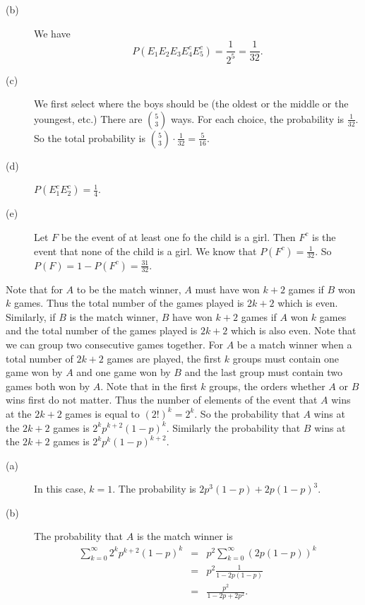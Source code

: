 \begin{description}
\begin{description}
\item[(b)] We have 
$$P(E_{1}E_{2}E_{3}E^{c}_{4}E^{c}_{5})=\frac{1}{2^{5}}=\frac{1}{32}.$$

\item[(c)] We first select where the boys should be (the oldest or the middle 
or the youngest, etc.) There are ${5\choose 3}$ ways. For each choice,
the probability is $\frac{1}{32}$. So the total probability 
is ${5\choose 3}\cdot \frac{1}{32}=\frac{5}{16}$. 

\item[(d)] $P(E_{1}^{c}E_{2}^{c})=\frac{1}{4}$.

\item[(e)] Let $F$ be the event of at least one fo the child is a girl.
Then $F^{c}$ is the event that none of the child is a girl. 
We know that $P(F^{c})=\frac{1}{32}$. So $P(F)=1-P(F^{c})=\frac{31}{32}$.

\end{description}

\item[{\rm 73.}] Note that for $A$ to be the match winner, $A$ must 
have won $k+2$ games if $B$ won $k$ games. Thus the total number of 
the games  played is $2k+2$ which is even. Similarly, if $B$ is the match 
winner, $B$ have won $k+2$ games if $A$ won $k$ games and the total number of 
the games  played is $2k+2$ which is also even. Note that 
we can group two consecutive games together. For $A$ be a match winner
when a total number of $2k+2$ games are played, 
the first $k$ groups must contain one game won by $A$ and one game won 
by $B$ and the last group must contain two games both won by $A$. 
Note that in the first $k$ groups, the orders whether $A$ or $B$ wins first
do not matter. Thus the number of elements of the 
event that $A$ wins at the $2k+2$ games is equal to 
$(2!)^{k}=2^{k}$. So the probability that $A$ wins at the $2k+2$ games
is $2^{k}p^{k+2}(1-p)^{k}$. Similarly the 
probability that $B$ wins at the $2k+2$ games
is $2^{k}p^{k}(1-p)^{k+2}$.


\begin{description}

\item[(a)] In this case, $k=1$. The probability is 
$2p^{3}(1-p)+2p(1-p)^{3}$.

\item[(b)] The probability that $A$ is the match winner is 
\begin{eqnarray*}
\sum_{k=0}^{\infty}2^{k}p^{k+2}(1-p)^{k}
&=&p^{2}\sum_{k=0}^{\infty}(2p(1-p))^{k}\\
&=&p^{2}\frac{1}{1-2p(1-p)}\\
&=&\frac{p^{2}}{1-2p+2p^{2}}.
\end{eqnarray*}

\end{description}




\end{description}



